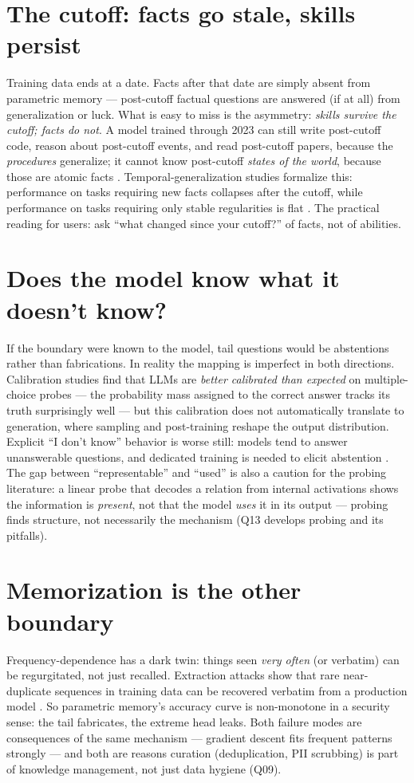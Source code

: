 \documentclass[11pt]{article}
\begin{document}
\section{The cutoff: facts go stale, skills persist}
Training data ends at a date. Facts after that date are simply absent from parametric memory --- post-cutoff factual questions are answered (if at all) from generalization or luck. What is easy to miss is the asymmetry: \emph{skills survive the cutoff; facts do not}. A model trained through 2023 can still write post-cutoff code, reason about post-cutoff events, and read post-cutoff papers, because the \emph{procedures} generalize; it cannot know post-cutoff \emph{states of the world}, because those are atomic facts \cite{lazaridou2021mindgap}. Temporal-generalization studies formalize this: performance on tasks requiring new facts collapses after the cutoff, while performance on tasks requiring only stable regularities is flat \cite{lazaridou2021mindgap}. The practical reading for users: ask ``what changed since your cutoff?'' of facts, not of abilities.

\section{Does the model know what it doesn't know?}
If the boundary were known to the model, tail questions would be abstentions rather than fabrications. In reality the mapping is imperfect in both directions. Calibration studies find that LLMs are \emph{better calibrated than expected} on multiple-choice probes --- the probability mass assigned to the correct answer tracks its truth surprisingly well \cite{kadavath2022know} --- but this calibration does not automatically translate to generation, where sampling and post-training reshape the output distribution. Explicit ``I don't know'' behavior is worse still: models tend to answer unanswerable questions, and dedicated training is needed to elicit abstention \cite{yin2023dontknow}. The gap between ``representable'' and ``used'' is also a caution for the probing literature: a linear probe that decodes a relation from internal activations shows the information is \emph{present}, not that the model \emph{uses} it in its output --- probing finds structure, not necessarily the mechanism (Q13 develops probing and its pitfalls).

\section{Memorization is the other boundary}
Frequency-dependence has a dark twin: things seen \emph{very often} (or verbatim) can be regurgitated, not just recalled. Extraction attacks show that rare near-duplicate sequences in training data can be recovered verbatim from a production model \cite{carlini2021extracting}. So parametric memory's accuracy curve is non-monotone in a security sense: the tail fabricates, the extreme head leaks. Both failure modes are consequences of the same mechanism --- gradient descent fits frequent patterns strongly --- and both are reasons curation (deduplication, PII scrubbing) is part of knowledge management, not just data hygiene (Q09).
\end{document}
